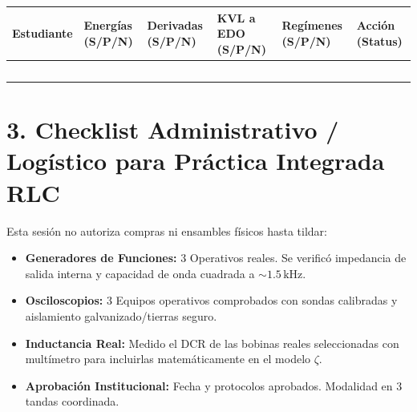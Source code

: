 \documentclass[11pt, a4paper]{article}
\begin{document}
\renewcommand{\arraystretch}{1.6}
\noindent
\begin{tabularx}{\textwidth}{
  >{\RaggedRight\arraybackslash\hsize=1.5\hsize}X 
  >{\centering\arraybackslash\hsize=0.8\hsize}X 
  >{\centering\arraybackslash\hsize=0.8\hsize}X 
  >{\centering\arraybackslash\hsize=0.9\hsize}X 
  >{\centering\arraybackslash\hsize=0.9\hsize}X 
  >{\centering\arraybackslash\hsize=1.1\hsize}X}
\toprule
\textbf{Estudiante} & \textbf{Energías \newline (S/P/N)} & \textbf{Derivadas \newline (S/P/N)} & \textbf{KVL a EDO \newline (S/P/N)} & \textbf{Regímenes \newline (S/P/N)} & \textbf{Acción (Status)} \\ 
\midrule
 & & & & & \\ \midrule
 & & & & & \\ \midrule
 & & & & & \\ \midrule
 & & & & & \\ \midrule
 & & & & & \\ 
\bottomrule
\end{tabularx}
\vspace{0.4cm}

\section*{3. Checklist Administrativo / Logístico para Práctica Integrada RLC}
\begin{tcolorbox}[colback=warnred!5!white, colframe=warnred, title=\textbf{Puerta de Seguridad (GO / NO-GO) - NO AUTORIZAR SIN CHECKS}]
Esta sesión no autoriza compras ni ensambles físicos hasta tildar:
\begin{itemize}
    \item[$\square$] \textbf{Generadores de Funciones:} 3 Operativos reales. Se verificó impedancia de salida interna y capacidad de onda cuadrada a $\sim 1.5\,\text{kHz}$.
    \item[$\square$] \textbf{Osciloscopios:} 3 Equipos operativos comprobados con sondas calibradas y aislamiento galvanizado/tierras seguro.
    \item[$\square$] \textbf{Inductancia Real:} Medido el DCR de las bobinas reales seleccionadas con multímetro para incluirlas matemáticamente en el modelo $\zeta$.
    \item[$\square$] \textbf{Aprobación Institucional:} Fecha y protocolos aprobados. Modalidad en 3 tandas coordinada.
\end{itemize}
\end{tcolorbox}
\end{document}
